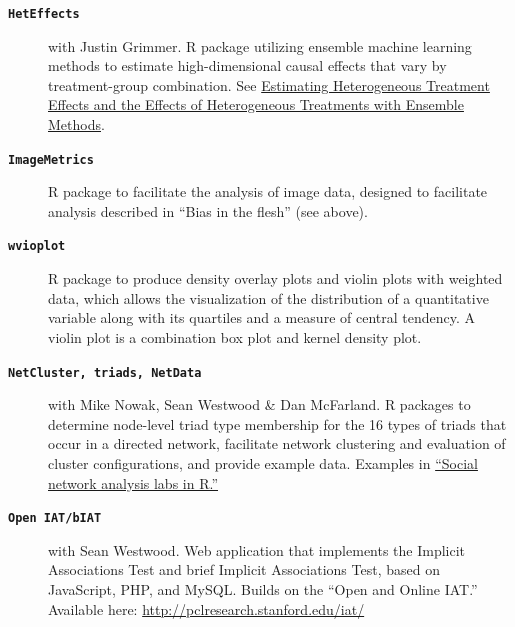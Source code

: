 \documentclass[letterpaper,11pt]{article}
\newcommand{\resheading}[1]{\vspace{4pt}{\large
\colorbox{mygrey}{\begin{minipage}{\textwidth}{\textbf{#1
\vphantom{p\^{E}}}}\end{minipage}}}\vspace{4pt}}
\begin{document}
\resheading{Software}
 
\begin{description}
\item[\large{\textbf{\texttt{HetEffects}}}] with Justin Grimmer. R package utilizing ensemble machine learning methods to estimate high-dimensional causal effects that vary by treatment-group combination. See \href{http://stanford.edu/~jgrimmer/het.pdf}{Estimating Heterogeneous Treatment Effects and the Effects of Heterogeneous Treatments with Ensemble Methods}.

\item[\large{\textbf{\texttt{ImageMetrics}}}] R package to facilitate the analysis of image data,
designed to facilitate analysis described in ``Bias in the flesh'' (see above).

\item[\large{\textbf{\texttt{wvioplot}}}] R package to produce density overlay plots and violin plots with weighted
data, which allows the visualization of the distribution of a quantitative variable along with its quartiles and a
measure of central tendency. A violin plot is a combination box plot and kernel density plot.

\item[\large{\textbf{\texttt{NetCluster, triads, NetData}}}] with Mike Nowak, Sean Westwood \& Dan McFarland. R packages to determine node-level triad type membership for the 16 types of triads that occur in a directed network, facilitate network clustering and evaluation of cluster configurations, and provide example data.  Examples in \href{http://sna.stanford.edu/rlabs.php}{``Social network analysis labs in R.''} 

%

\item[\large{\textbf{\texttt{Open IAT/bIAT}}}] with Sean Westwood.  Web application that implements the Implicit
Associations Test and brief Implicit Associations Test, based on JavaScript, PHP, and MySQL.  Builds on the ``Open and
Online IAT.''  Available here: \url{http://pclresearch.stanford.edu/iat/}
\end{description}
\end{document}
